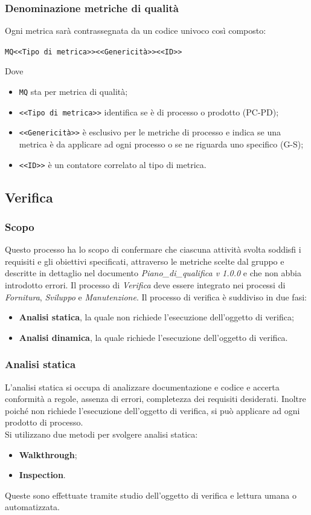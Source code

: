 \subsubsection{Denominazione metriche di qualità}
Ogni metrica sarà contrassegnata da un codice univoco così composto:
\begin{center}
	\verb|MQ<<Tipo di metrica>><<Genericità>><<ID>>|
\end{center}
Dove 
\begin{itemize}
	\item \verb|MQ| sta per metrica di qualità;
	\item \verb|<<Tipo di metrica>>| identifica se è di processo o prodotto (PC-PD);
	\item \verb|<<Genericità>>| è esclusivo per le metriche di processo e indica se una metrica è da applicare ad ogni processo o se ne riguarda uno specifico (G-S);
	\item \verb|<<ID>>| è un contatore correlato al tipo di metrica.
\end{itemize}
\subsection{Verifica}
\subsubsection{Scopo}
Questo processo ha lo scopo di confermare che ciascuna attività svolta soddisfi i requisiti e gli obiettivi specificati, attraverso le metriche scelte dal gruppo e descritte in dettaglio nel documento \textit{Piano\_di\_qualifica v 1.0.0} e che non abbia introdotto errori.
Il processo di \textit{Verifica} deve essere integrato nei processi di \textit{Fornitura}, \textit{Sviluppo} e \textit{Manutenzione}.
\newline
\newline
Il processo di verifica è suddiviso in due fasi:
\begin{itemize}
	\item \textbf{Analisi statica}, la quale non richiede l'esecuzione dell'oggetto di verifica;
	\item \textbf{Analisi dinamica}, la quale richiede l'esecuzione dell'oggetto di verifica.
\end{itemize}

\subsubsection{Analisi statica}
L'analisi statica si occupa di analizzare documentazione e codice e accerta conformità a regole, assenza di errori, completezza dei requisiti desiderati.
Inoltre poiché non richiede l'esecuzione dell’oggetto di verifica, si può applicare ad ogni prodotto di processo.\\
Si utilizzano due metodi per svolgere analisi statica:
\begin{itemize}
	\item \textbf{Walkthrough};
	\item \textbf{Inspection}.
\end{itemize}
Queste sono effettuate tramite studio dell’oggetto di verifica e lettura umana o automatizzata.
